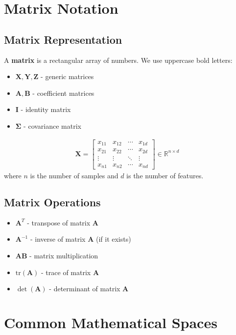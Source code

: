 \documentclass{article}
\providecommand{\mX}{\mathbf{X}}
\providecommand{\mY}{\mathbf{Y}}
\providecommand{\mZ}{\mathbf{Z}}
\providecommand{\mA}{\mathbf{A}}
\providecommand{\mB}{\mathbf{B}}
\providecommand{\mI}{\mathbf{I}}
\providecommand{\mSigma}{\boldsymbol{\Sigma}}
\providecommand{\Real}{\mathbb{R}}
\begin{document}
\section{Matrix Notation}

\subsection{Matrix Representation}
A \textbf{matrix} is a rectangular array of numbers. We use uppercase bold letters:
\begin{itemize}
    \item $\mX, \mY, \mZ$ - generic matrices  
    \item $\mA, \mB$ - coefficient matrices
    \item $\mI$ - identity matrix
    \item $\mSigma$ - covariance matrix
\end{itemize}

\begin{tcolorbox}[colback=orange!5!white,colframe=orange!75!black,title=Matrix Example]
\begin{align}
\mX = \begin{bmatrix} 
x_{11} & x_{12} & \cdots & x_{1d} \\
x_{21} & x_{22} & \cdots & x_{2d} \\
\vdots & \vdots & \ddots & \vdots \\
x_{n1} & x_{n2} & \cdots & x_{nd}
\end{bmatrix} \in \Real^{n \times d}
\end{align}
where $n$ is the number of samples and $d$ is the number of features.
\end{tcolorbox}

\subsection{Matrix Operations}
\begin{itemize}
    \item $\mA^T$ - transpose of matrix $\mA$
    \item $\mA^{-1}$ - inverse of matrix $\mA$ (if it exists)
    \item $\mA\mB$ - matrix multiplication
    \item $\text{tr}(\mA)$ - trace of matrix $\mA$
    \item $\det(\mA)$ - determinant of matrix $\mA$
\end{itemize}

\section{Common Mathematical Spaces}
\end{document}
